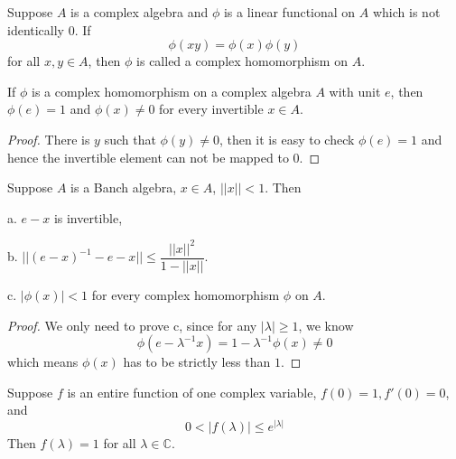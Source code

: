 \documentclass[lang=en, color=blue, ]{elegantbook}
\newcommand{\C}{\mathbb{C}}
\begin{document}
\begin{definition}
    Suppose $A$ is a complex algebra and $\phi$ is a linear functional on $A$ which is not identically $0$. If
    \[\phi(xy) = \phi(x)\phi(y)\]
    for all $x,y\in A$, then $\phi$ is called a complex homomorphism on $A$.
\end{definition}

\begin{proposition}
    If $\phi$ is a complex homomorphism on a complex algebra $A$ with unit $e$, then $\phi(e) = 1$ and $\phi(x) \neq 0$ for every invertible $x\in A$.
\end{proposition}
\begin{proof}\par
    There is $y$ such that $\phi(y) \neq 0$, then it is easy to check $\phi(e) = 1$ and hence the invertible element can not be mapped to $0$.
\end{proof}

\begin{theorem}
    Suppose $A$ is a Banch algebra, $x\in A$, $||x||<1$. Then\par
    a. $e-x$ is invertible,\par
    b. $||(e-x)^{-1}-e-x||\leq \dfrac{||x||^2}{1-||x||}$.\par
    c. $|\phi(x)|<1$ for every complex homomorphism $\phi$ on $A$.
\end{theorem}
\begin{proof}
    We only need to prove c, since for any $|\lambda| \geq 1$, we know
    \[
    \phi(e-\lambda^{-1}x) = 1 - \lambda^{-1}\phi(x)\neq 0
    \]
    which means $\phi(x)$ has to be strictly less than $1$. 
\end{proof}

\begin{lemma}
    Suppose $f$ is an entire function of one complex variable, $f(0) = 1, f'(0) = 0$, and
    \[0 < |f(\lambda)| \leq e^{|\lambda|}\]
    Then $f(\lambda) = 1$ for all $\lambda \in \C$.
\end{lemma}
\end{document}
